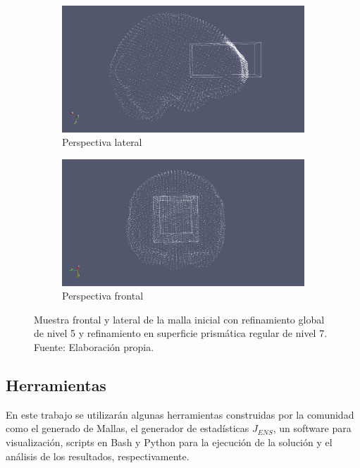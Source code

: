 \begin{figure}[H]
    \centering
    \begin{subfigure}[t]{0.45\textwidth}
        \includegraphics[width=1.0\textwidth]{figures/bad_quality_zone/cortex_surf.png}
        \caption{Perspectiva lateral}
    \end{subfigure}
    \begin{subfigure}[t]{0.45\textwidth}
        \includegraphics[width=1.0\textwidth]{figures/bad_quality_zone/cortex_surf_points.png}
        \caption{Perspectiva frontal}
    \end{subfigure}
    \caption{  Muestra frontal y lateral de la malla inicial con refinamiento global de nivel 5 y refinamiento en superficie prismática regular de nivel 7.\\ Fuente: Elaboración propia.}
    \label{fig:cortex_surf}
\end{figure}

\subsection{Herramientas}

En este trabajo se utilizarán algunas herramientas construidas por la comunidad como el generado de Mallas, el generador de estadísticas $J_{ENS}$, un software para visualización, scripts en Bash y Python para la ejecución de la solución y el análisis de los resultados, respectivamente.

